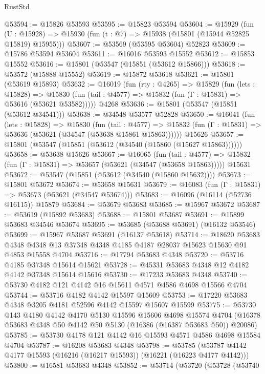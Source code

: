 \begin{lexlean}{RustStd}
\begin{coremodule}
@53594 := @15826 @53593
@53595 := @15823 @53594
@53604 := @15929
    (fun (U : @15928) => @15930 (fun (t : @7) => @15938 (@15801 (@15944 @52825 @15819) @15955)))
@53607 := @53569 (@53595 @53604) @52823
@53609 := @15786 @53594 @53604
@53611 := @16016 @53593 @15552
@53612 := @15853 @15552
@53616 := @15801 (@53547 (@15851 (@53612 @15866)))
@53618 := @53572 (@15888 @15552)
@53619 := @15872 @53618
@53621 := @15801 (@53619 @15893)
@53632 := @16019
    (fun (rty : @4265) =>
    @15829
      (fun (lets : @15828) =>
      @15830 (fun (tail : @4577) => @15832 (fun (Γ : @15831) => @53616 (@53621 @53582)))))
    @4268
@53636 := @15801 (@53547 (@15851 (@53612 @34541)))
@53638 := @34548 @53577 @52828
@53650 := @16041
    (fun (lets : @15828) =>
    @15830
      (fun (tail : @4577) =>
      @15832 (fun (Γ : @15831) => @53636 (@53621 (@34547 (@53638 @15861 @15863))))))
    @15626
@53657 := @15801 (@53547 (@15851 (@53612 (@34540 (@15860 (@15627 @15863))))))
@53658 := @53638 @15626
@53667 := @16065
    (fun (tail : @4577) => @15832 (fun (Γ : @15831) => @53657 (@53621 (@34547 (@53658 @15863)))))
    @15631
@53672 := @53547 (@15851 (@53612 (@34540 (@15860 @15632))))
@53673 := @15801 @53672
@53674 := @53658 @15631
@53679 := @16083 (fun (Γ : @15831) => @53673 (@53621 (@34547 @53674)))
@53683 := @16096 (@16114 (@52736 @16115)) @15879
@53684 := @53679 @53683
@53685 := @15967 @53672
@53687 := @53619 (@15892 @53683)
@53688 := @15801 @53687
@53691 := @15899 @53683 @34546 @53674
@53695 := @53685 (@53688 @53691) (@16132 @53546)
@53699 := @15967 @53687 @53691 (@16137 @53618)
@53714 := @18620
    @53683
    @4348
    @4348
    @13
    @37348
    @4348
    @4185
    @4187
    @28037
    @15623
    @15630
    @91
    @4853
    @15558
    @4704
@53716 := @17794 @53683 @4348
@53720 := @53716 @4185 @37348 @15614 @15621
@53728 := @45331 @53683 @4348 @12 @4182 @4142 @37348 @15614 @15616
@53730 := @17233 @53683 @4348
@53740 := @53730 @4182 @121 @4142 @16 @15611 @4571 @4586 @4698 @15566 @4704
@53744 := @53716 @4182 @4142 @15597 @15609
@53753 := @17220 @53683 @4348 @3205 @4181 @52596 @4142 @15597 @15607 @15599
@53775 := @53730
    @143
    @4180
    @4142
    @4170
    @5130
    @15596
    @15606
    @4698
    @15574
    @4704
    (@16378 @53683 @4348 @50 @4142 @50 @5130 (@16386 (@16387 @53683 @50)) @20086)
@53785 := @53730 @4178 @121 @4142 @16 @15593 @4571 @4586 @4698 @15584 @4704
@53787 := @16208 @53683 @4348
@53798 := @53785 (@53787 @4142 @4177 @15593 (@16216 (@16217 @15593)) (@16221 (@16223 @4177 @4142)))
@53800 := @16581 @53683 @4348
@53852 := @53714
    (@53720
      (@53728
        (@53740

\end{coremodule}
\end{lexlean}
